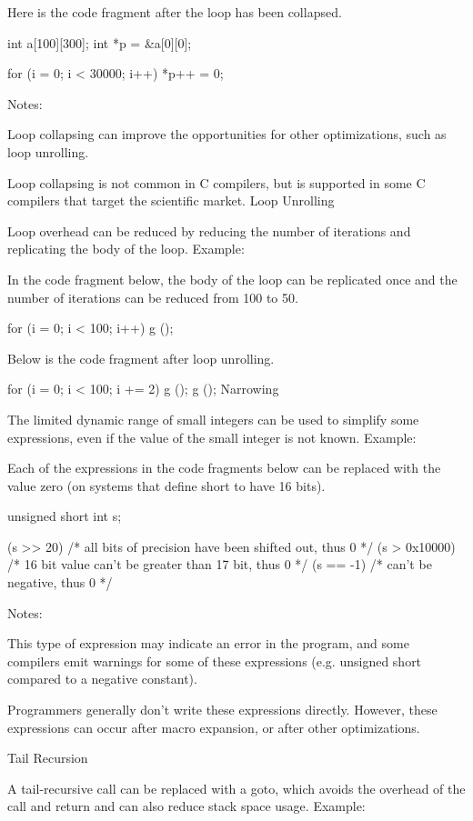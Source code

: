 {{{{{{{{{{Here is the code fragment after the loop has been collapsed.

    int a[100][300];
    int *p = &a[0][0];

    for (i = 0; i < 30000; i++)
      *p++ = 0;

Notes:

Loop collapsing can improve the opportunities for other optimizations, such as loop unrolling.

Loop collapsing is not common in C compilers, but is supported in some C compilers that target the scientific market. 
Loop Unrolling

Loop overhead can be reduced by reducing the number of iterations and replicating the body of the loop.
Example:

In the code fragment below, the body of the loop can be replicated once and the number of iterations can be reduced from 100 to 50.

    for (i = 0; i < 100; i++)
      g ();

Below is the code fragment after loop unrolling.

    for (i = 0; i < 100; i += 2)
    {
      g ();
      g ();
    }
Narrowing

The limited dynamic range of small integers can be used to simplify some expressions, even if the value of the small integer is not known.
Example:

Each of the expressions in the code fragments below can be replaced with the value zero (on systems that define short to have 16 bits).

    unsigned short int s;

    (s >> 20)      /* all bits of precision have been shifted out, thus 0 */
    (s > 0x10000)  /* 16 bit value can't be greater than 17 bit, thus 0 */
    (s == -1)      /* can't be negative, thus 0 */

Notes:

This type of expression may indicate an error in the program, and some compilers emit warnings for some of these expressions (e.g. unsigned short compared to a negative constant).

Programmers generally don't write these expressions directly. However, these expressions can occur after macro expansion, or after other optimizations. 

Tail Recursion

A tail-recursive call can be replaced with a goto, which avoids the overhead of the call and return and can also reduce stack space usage.
Example:

}}}}}}}}}}
